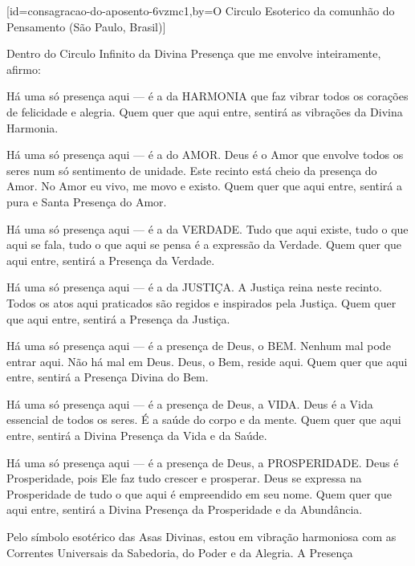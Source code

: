 \scleardpage
{}[id={consagracao-do-aposento-6vzmc1},by={O Circulo Esoterico da comunhão do Pensamento (São Paulo, Brasil)}]
  \begin{passage}[PT]{}
    \par
    Dentro do Circulo Infinito da Divina Presença que
    me envolve inteiramente, afirmo:
    \par
    Há uma só presença aqui --- é a da HARMONIA que faz
    vibrar todos os corações de felicidade e alegria.
    Quem quer que aqui entre, sentirá as vibrações da
    Divina Harmonia.
    \par
    Há uma só presença aqui --- é a do AMOR. Deus é o
    Amor que envolve todos os seres num só sentimento
    de unidade. Este recinto está cheio da presença do
    Amor. No Amor eu vivo, me movo e existo. Quem quer
    que aqui entre, sentirá a pura e Santa Presença do
    Amor.
    \par
    Há uma só presença aqui --- é a da VERDADE. Tudo
    que aqui existe, tudo o que aqui se fala, tudo o
    que aqui se pensa é a expressão da Verdade. Quem
    quer que aqui entre, sentirá a Presença da Verdade.
    \par
    Há uma só presença aqui --- é a da JUSTIÇA.
    A Justiça reina neste recinto. Todos os atos aqui
    praticados são regidos e inspirados pela Justiça.
    Quem quer que aqui entre, sentirá
    a Presença da Justiça.
    \par
    Há uma só presença aqui --- é a presença de Deus,
    o BEM. Nenhum mal pode entrar aqui. Não há mal em
    Deus. Deus, o Bem, reside aqui. Quem quer que aqui
    entre, sentirá a Presença Divina do Bem.
    \par
    Há uma só presença aqui --- é a presença de Deus,
    a VIDA. Deus é a Vida essencial de todos os seres.
    É a saúde do corpo e da mente. Quem quer que aqui
    entre, sentirá a Divina Presença da Vida e da Saúde.
    \par
    Há uma só presença aqui --- é a presença de Deus,
    a PROSPERIDADE. Deus é Prosperidade, pois Ele faz
    tudo crescer e prosperar. Deus se expressa na
    Prosperidade de tudo o que aqui é empreendido em
    seu nome. Quem quer que aqui entre, sentirá
    a Divina Presença da Prosperidade e da Abundância.
    \par\hardbrk
    Pelo símbolo esotérico das Asas Divinas, estou
    em vibração harmoniosa com as Correntes Universais
    da Sabedoria, do Poder e da Alegria. A Presença

\end{passage}
